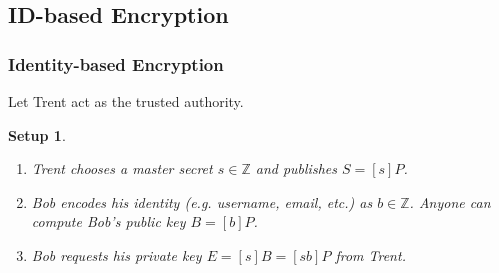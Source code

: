 \documentclass{beamer}
\newtheorem{algorithm}{Algorithm}
\newtheorem{setup}{Setup}
\begin{document}

    \subsection{ID-based Encryption}
    \begin{frame}
        \frametitle{Identity-based Encryption}
        Let Trent act as the trusted authority.
        \vfill
        \begin{setup}
            \begin{enumerate}
                \item Trent chooses a master secret \(s \in \mathbb{Z}\) and
                    publishes \(S = [s]P\).
                \item Bob encodes his identity (e.g. username, email, etc.)
                    as \(b \in \mathbb{Z}\). Anyone can compute Bob's public
                    key \(B = [b]P\).
                \item Bob requests his private key
                    \(E = [s]B = [sb]P\) from Trent.
            \end{enumerate}
        \end{setup}
    \end{frame}
\end{document}
